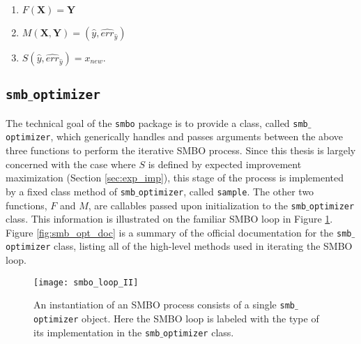 \begin{enumerate}
\item $F(\mathbf{X})=\mathbf{Y}$
\item $M(\mathbf{X},\mathbf{Y}) = (\hat{y},\hat{err}_{\hat{y}})$
\item $S(\hat{y},\hat{err}_{\hat{y}}) = x_{new}$.
\end{enumerate}

\subsection{\texttt{smb$\_$optimizer}}

The technical goal of the \texttt{smbo} package is to provide a class, called \texttt{smb$\_$optimizer}, which generically handles and passes arguments between the above three functions to perform the iterative SMBO process. Since this thesis is largely concerned with the case where $S$ is defined by expected improvement maximization (Section \ref{sec:exp_imp}), this stage of the process is implemented by a fixed class method of \texttt{smb$\_$optimizer}, called \texttt{sample}. The other two functions, $F$ and $M$, are callables passed upon initialization to the \texttt{smb$\_$optimizer} class. This information is illustrated on the familiar SMBO loop in Figure \ref{fig:smbo_loop_II}. Figure \ref{fig:smb_opt_doc} is a summary of the official documentation for the \texttt{smb$\_$optimizer} class, listing all of the high-level methods used in iterating the SMBO loop.

\begin{figure}[h]
	\centering
	\texttt{[image: smbo\_loop\_II]}
	\caption{An instantiation of an SMBO process consists of a single \texttt{smb$\_$optimizer} object. Here the SMBO loop is labeled with the type of its implementation in the \texttt{smb$\_$optimizer} class.}
	\label{fig:smbo_loop_II}

\end{figure}


\begin{minipage}{\textwidth}
\begin{framed}

\end{framed}

 \label{fig:smb_opt_doc}

\end{minipage}




